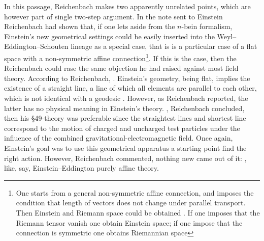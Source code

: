 \documentclass[draft]{article}
\newcommand{\manu}[1]{\citep[#1]{Reichenbach1928b}}
\newcommand{\nbein}{$n$-bein\xspace}
\begin{document}
In this passage, Reichenbach makes two apparently unrelated points, which are however part of single two-step argument. In the note sent to Einstein Reichenbach had shown that, if one lets aside from the \nbein formalism, Einstein's new geometrical settings could be easily inserted into the Weyl--Eddington--Schouten lineage as a special case, that is is a particular case of a flat space with a non-symmetric affine connection\footnote{One starts from a general non-symmetric affine \Gtmn connection, and imposes the condition that length of vectors does not change under parallel transport. Then Einstein and Riemann space could be obtained   \manu{5}. If one imposes that the Riemann tensor vanish one obtain Einstein space; if one impose that the connection is symmetric one obtains Riemannian space}. If this is the case, then the Reichenbach could rase the same objection he had raised against most \uft field theory.  According to Reichenbach,  \manu{7}. Einstein's geometry, being flat, implies the existence of a straight line, a line of which all elements are parallel to each other, which is not identical with a geodesic \citep[224]{Einstein19282}. However, as Reichenbach reported, the latter has no physical meaning in Einstein's theory.  , Reichenbach concluded, then his \S49-theory was preferable since the straightest lines and shortest line correspond to the motion of charged and uncharged test particles under the influence of the combined gravitational-electromagnetic field. Once again, Einstein's goal was to use this geometrical apparatus a starting point find the right action. However, Reichenbach commented, nothing new came out of it:  \manu{6}, like, say, Einstein--Eddington purely affine theory. 



\end{document}
